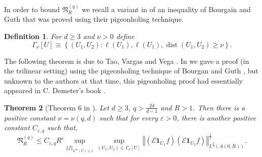 \documentclass{amsart}%
\newtheorem{theorem}{Theorem}
\theoremstyle{plain}
\newtheorem{definition}[theorem]{Definition}
\numberwithin{equation}{section}
\begin{document}
In order to bound $\mathfrak{N}_{R}^{\left(  q\right)  }$ we recall a variant
in \cite{RiSa} of an inequality of Bourgain and Guth \cite[Theorem 1$^{\prime
}$]{BoGu} that was proved using their pigeonholing technique.

\begin{definition}
For $d\geq3$ and $\nu>0$ define%
\begin{equation}
\Gamma_{\nu}\left[  U\right]  \equiv\left\{  \left(  U_{1},U_{2}\right)
:\ell\left(  U_{1}\right)  ,\ell\left(  U_{1}\right)  ,\operatorname*{dist}%
\left(  U_{1},U_{2}\right)  \geq\nu\right\}  .\label{weak sep var}%
\end{equation}

\end{definition}

The following theorem is due to Tao, Vargas and Vega \cite{TaVaVe}. In
\cite{RiSa} we gave a proof (in the trilinear setting) using the pigeonholing
technique of Bourgan and Guth \cite{BoGu}, but unknown to the authors at that
time, this pigeonholing proof had essentially appeared in C. Demeter's book
\cite[see Proposition 7.20]{Dem}.

\begin{theorem}
[Theorem 6 in \cite{RiSa}]\label{Thm 6 copy(1)}Let $d\geq3$, $q>\frac{2d}%
{d-1}$ and $R>1$. Then there is a positive constant $\nu=\nu\left(
q,d\right)  $ such that for every $\varepsilon>0$, there is another positive
constant $C_{\varepsilon,q}$ such that,%
\begin{equation}
\mathfrak{N}_{R}^{\left(  q\right)  }\leq C_{\varepsilon,q}R^{\varepsilon}%
\sup_{\left\Vert f\right\Vert _{L^{\infty}\left(  U\right)  \leq1}}%
\sup_{\left(  U_{1},U_{2}\right)  \in\Gamma_{\nu}\left[  U\right]  }\left\Vert
\left(  \mathcal{E}\mathbf{1}_{U_{1}}f\right)  \left(  \mathcal{E}%
\mathbf{1}_{U_{2}}f\right)  \right\Vert _{L^{\frac{q}{2}}\left(  A\left(
0,R\right)  \right)  }^{\frac{1}{2}}.\label{frak N_R}%
\end{equation}

\end{theorem}
\end{document}
